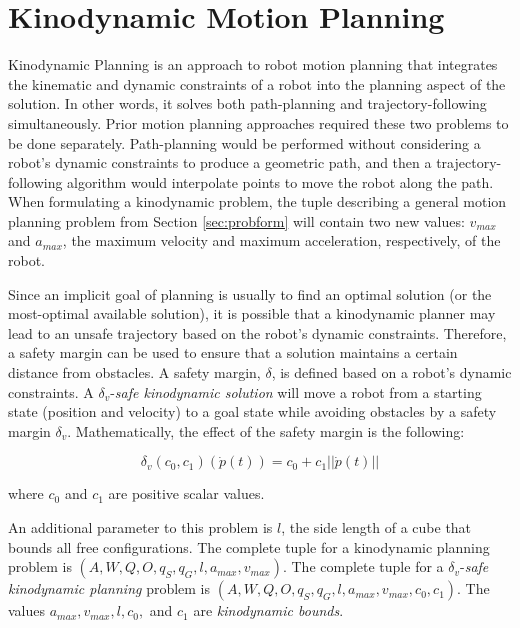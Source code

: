 

\section{ Kinodynamic Motion Planning } \label{sec:kino}

Kinodynamic Planning is an approach to robot motion planning that integrates the kinematic and dynamic constraints of a robot into the planning aspect of the solution. In other words, it solves both path-planning and trajectory-following simultaneously. Prior motion planning approaches required these two problems to be done separately. Path-planning would be performed without considering a robot's dynamic constraints to produce a geometric path, and then a trajectory-following algorithm would interpolate points to move the robot along the path. When formulating a kinodynamic problem, the tuple describing a general motion planning problem from Section \ref{sec:probform} will contain two new values: $v_{max}$ and $a_{max}$, the maximum velocity and maximum acceleration, respectively, of the robot.


Since an implicit goal of planning is usually to find an optimal solution (or the most-optimal available solution), it is possible that a kinodynamic planner may lead to an unsafe trajectory based on the robot's dynamic constraints. Therefore, a safety margin can be used to ensure that a solution maintains a certain distance from obstacles. A safety margin, $\delta$, is defined based on a robot's dynamic constraints. A $\delta_v$-\emph{safe kinodynamic solution} will move a robot from a starting state (position and velocity) to a goal state while avoiding obstacles by a safety margin $\delta_v$. Mathematically, the effect of the safety margin is the following:

\begin{equation}
\delta_v(c_0, c_1)(\dot{p}(t)) = c_0 + c_1||\dot{p}(t)||
\end{equation}

where $c_0$ and $c_1$ are positive scalar values.

An additional parameter to this problem is $l$, the side length of a cube that bounds all free configurations. The complete tuple for a kinodynamic planning problem is $(A, W, Q, O, q_S, q_G, l, a_{max}, v_{max})$. The complete tuple for a $\delta_v$-\emph{safe kinodynamic planning} problem is $(A, W, Q, O, q_S, q_G, l, a_{max}, v_{max}, c_0, c_1)$. The values $a_{max}, v_{max}, l, c_0,$ and $c_1$ are \emph{kinodynamic bounds}.



